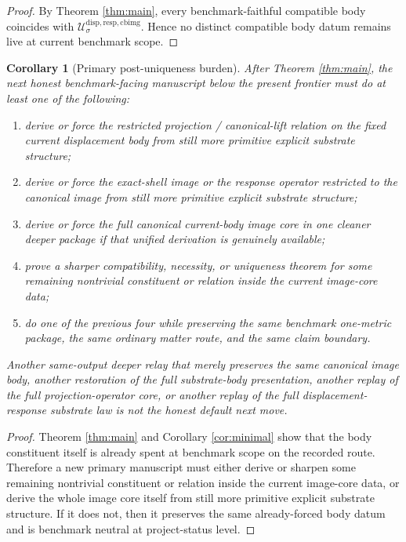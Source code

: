 \documentclass[11pt]{article}
\newcommand{\CanonicalImageBody}[1]{\mathcal U_{#1}^{\mathrm{disp,resp,cbimg}}}
\newtheorem{corollary}{Corollary}
\begin{document}
\begin{proof}
By Theorem \ref{thm:main}, every benchmark-faithful compatible body coincides with \(\CanonicalImageBody{\sigma}\). Hence no distinct compatible body datum remains live at current benchmark scope.
\end{proof}

\begin{corollary}[Primary post-uniqueness burden]
\label{cor:next}
After Theorem \ref{thm:main}, the next honest benchmark-facing manuscript below the present frontier must do at least one of the following:
\begin{enumerate}
    \item derive or force the restricted projection / canonical-lift relation on the fixed current displacement body from still more primitive explicit substrate structure;
    \item derive or force the exact-shell image or the response operator restricted to the canonical image from still more primitive explicit substrate structure;
    \item derive or force the full canonical current-body image core in one cleaner deeper package if that unified derivation is genuinely available;
    \item prove a sharper compatibility, necessity, or uniqueness theorem for some remaining nontrivial constituent or relation inside the current image-core data;
    \item do one of the previous four while preserving the same benchmark one-metric package, the same ordinary matter route, and the same claim boundary.
\end{enumerate}
Another same-output deeper relay that merely preserves the same canonical image body, another restoration of the full substrate-body presentation, another replay of the full projection-operator core, or another replay of the full displacement-response substrate law is not the honest default next move.
\end{corollary}

\begin{proof}
Theorem \ref{thm:main} and Corollary \ref{cor:minimal} show that the body constituent itself is already spent at benchmark scope on the recorded route. Therefore a new primary manuscript must either derive or sharpen some remaining nontrivial constituent or relation inside the current image-core data, or derive the whole image core itself from still more primitive explicit substrate structure. If it does not, then it preserves the same already-forced body datum and is benchmark neutral at project-status level.
\end{proof}
\end{document}
